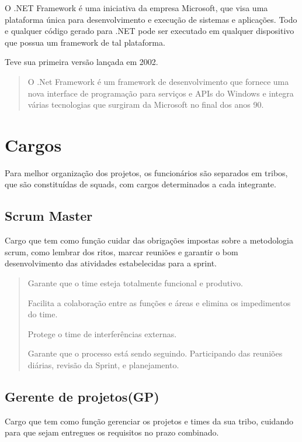 O .NET Framework é uma iniciativa da empresa Microsoft, que visa uma plataforma única para desenvolvimento e execução de sistemas e aplicações.
Todo e qualquer código gerado para .NET pode ser executado em qualquer dispositivo que possua um framework de tal plataforma.

Teve sua primeira versão lançada em 2002.

\begin{quote}
  
O .Net Framework é um framework de desenvolvimento que fornece uma nova interface de programação para serviços e APIs do Windows e integra várias tecnologias que surgiram da Microsoft no final dos anos 90. \cite{thai2003net}
\end{quote}

\section{Cargos}

Para melhor organização dos projetos, os funcionários são separados em tribos, que são constituídas de squads, com cargos determinados a cada integrante.

\subsection{Scrum Master}

Cargo que tem como função cuidar das obrigações impostas sobre a metodologia scrum, como lembrar dos ritos, marcar reuniões e garantir o bom desenvolvimento das atividades estabelecidas para a sprint.

\begin{quote}
Garante que o time esteja
totalmente funcional e
produtivo.

Facilita a colaboração entre as
funções e áreas e elimina os
impedimentos do time.

Protege o time de
interferências externas.

Garante que o processo está
sendo seguindo. Participando
das reuniões diárias, revisão
da Sprint, e planejamento. \cite{sabbagh2014scrum}

\end{quote}
\subsection{Gerente de projetos(GP)}

Cargo que tem como função gerenciar os projetos e times da sua
 tribo, cuidando para que sejam entregues os requisitos no prazo combinado.

